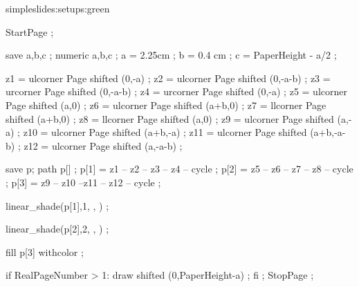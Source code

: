 \startsetups simpleslides:setups:green
\stopsetups


    {}
    {}



\unexpanded{}

StartPage ;

save a,b,c ; numeric a,b,c ;
a = 2.25cm ;
b = 0.4 cm ;
c = PaperHeight - a/2 ;

z1 = ulcorner Page shifted (0,-a) ;
z2 = ulcorner Page shifted (0,-a-b) ;
z3 = urcorner Page shifted (0,-a-b) ;
z4 = urcorner Page shifted (0,-a) ;
z5 = ulcorner Page shifted (a,0) ;
z6 = ulcorner Page shifted (a+b,0) ;
z7 = llcorner Page shifted (a+b,0) ;
z8 = llcorner Page shifted (a,0) ;
z9 = ulcorner Page shifted (a,-a) ;
z10 = ulcorner Page shifted (a+b,-a) ;
z11 = ulcorner Page shifted (a+b,-a-b) ;
z12 = ulcorner Page shifted (a,-a-b) ;

save p; path p[] ;
p[1] = z1 -- z2 -- z3 -- z4 -- cycle ;
p[2] = z5 -- z6 -- z7 -- z8 -- cycle ;
p[3] = z9 -- z10 --z11 -- z12 -- cycle ;

linear_shade(p[1],1,
             ,
             ) ;

linear_shade(p[2],2,
             ,
             ) ;

fill p[3] withcolor  ;

if RealPageNumber > 1:
	draw  shifted (0,PaperHeight-a) ;
fi ;
StopPage ;
\stopuseMPgraphic

